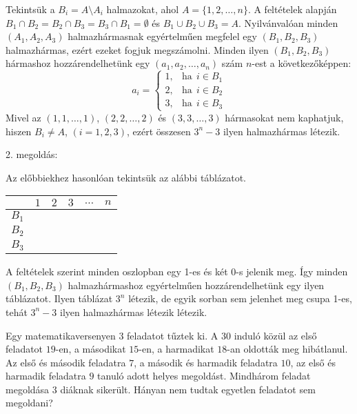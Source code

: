 \begin{solution}
	Tekintsük a $B_{i}=A\setminus A_{i}$ halmazokat, ahol $A=\{1,2,\dots,n\}$.
	A feltételek alapján $B_{1}\cap B_{2}=B_{2}\cap B_{3}=B_{3}\cap B_{1}=\emptyset$
	és $B_{1}\cup B_{2}\cup B_{3}=A$. Nyilvánvalóan minden $(A_{1},A_{2},A_{3})$
	halmazhármasnak egyértelműen megfelel egy $(B_{1},B_{2},B_{3})$ halmazhármas,
	ezért ezeket fogjuk megszámolni. Minden ilyen $(B_{1},B_{2},B_{3})$
	hármashoz hozzárendelhetünk egy $(a_{1},a_{2},\dots,a_{n})$ szám
	$n$-est a következőképpen: 
	\[
	a_{i}=\left\{ \begin{array}{rl}
		1, & \mathrm{ha}\ \ i\in B_{1}\\
		2, & \mathrm{ha}\ \ i\in B_{2}\\
		3, & \mathrm{ha}\ \ i\in B_{3}
	\end{array}\right.
	\]
	Mivel az $(1,1,\dots,1)$, $(2,2,\dots,2)$ és $(3,3,\dots,3)$ hármasokat
	nem kaphatjuk, hiszen $B_{i}\neq A$, $(i=1,2,3)$, ezért összesen
	$3^{n}-3$ ilyen halmazhármas létezik.
	
	2. megoldás:
	
	Az előbbiekhez hasonlóan tekintsük az alábbi táblázatot. 
	\begin{center}
		\begin{tabular}{|c|c|c|c|c|c|}
			\hline 
			& $1$ & $2$ & $3$ & $\dots$ & $n$\tabularnewline
			\hline 
			$B_{1}$ &  &  &  &  & \tabularnewline
			\hline 
			$B_{2}$ &  &  &  &  & \tabularnewline
			\hline 
			$B_{3}$ &  &  &  &  & \tabularnewline
			\hline 
		\end{tabular}
		\par\end{center}
	A feltételek szerint minden oszlopban egy 1-es és két 0-s jelenik
	meg. Így minden $(B_{1},B_{2},B_{3})$ halmazhármashoz egyértelműen
	hozzárendelhetünk egy ilyen táblázatot. Ilyen táblázat $3^{n}$ létezik,
	de egyik sorban sem jelenhet meg csupa 1-es, tehát $3^{n}-3$ ilyen
	halmazhármas létezik létezik.
\end{solution}
\begin{extraproblem}
	Egy matematikaversenyen $3$ feladatot tűztek ki. A $30$ induló
	közül az első feladatot $19$-en, a másodikat $15$-en, a harmadikat
	$18$-an oldották meg hibátlanul. Az első és második feladatra $7$,
	a második és harmadik feladatra $10$, az első és harmadik feladatra
	$9$ tanuló adott helyes megoldást. Mindhárom feladat megoldása $3$
	diáknak sikerült. Hányan nem tudtak egyetlen feladatot sem megoldani? 
\end{extraproblem}
